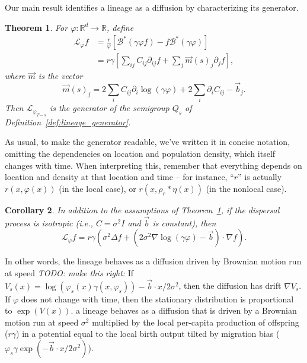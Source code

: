 \documentclass[12pt]{article}
\newtheorem{theorem}{Theorem}[section]
\newtheorem{corollary}[theorem]{Corollary}
\newcommand{\IR}{\mathbb R}
\newcommand{\grad}{\nabla}
\newcommand{\DG}{\mathcal{B}}  %
\newcommand{\meanq}{\vec b}    %
\newcommand{\covq}{C}     %
\newcommand{\kernel}{\rho}  %
\newcommand{\smooth}[1]{\kernel_{#1} \! * \!}  %
\newcommand{\Lgen}{\mathcal{L}}    %
\newcommand{\comment}[1]{{\color{blue} \it #1}}
\begin{document}
Our main result identifies a lineage as a diffusion
by characterizing its generator.


\begin{theorem} \label{thm:lineages}
    For $\varphi: \IR^d \to \IR$, define
    \begin{align}
        \label{eqn:lineage_generator}
        \Lgen_\varphi f
        &=
        \frac{r}{\varphi}
        \left[
            \DG^*(\gamma \varphi f) 
            - f \DG^* (\gamma \varphi)
        \right] \\
        &= \label{eqn:lineage_generator2}
        r\gamma
        \left[
            \sum_{ij} \covq_{ij} \partial_{ij} f
            + \sum_j \vec{m}(s)_j \partial_j f
        \right] ,
    \end{align}
    where $\vec{m}$ is the vector
    $$
    \vec{m}(s)_j
    =
    2 \sum_i C_{ij} \partial_i \log(\gamma \varphi)
    + 2 \sum_i \partial_i C_{ij}
    - \meanq_j .
    $$
    Then $\Lgen_{\varphi_{T-s}}$ is the generator of the semigroup $Q_s$
    of Definition~\ref{def:lineage_generator}.
\end{theorem}

As usual,
to make the generator readable, we've written it in concise notation,
omitting the dependencies on location and population density,
which itself changes with time.
When interpreting this,
remember that everything depends on location and density at that location and time --
for instance, ``$r$'' is actually $r(x, \varphi(x))$ (in the local case),
or $r(x, \smooth{r} \eta(x))$ (in the nonlocal case).

\begin{corollary} \label{cor:lineages_simple}
    In addition to the assumptions of Theorem~\ref{thm:lineages},
    if the dispersal process is isotropic
    (i.e., $\covq = \sigma^2 I$ and $\meanq$ is constant),
    then
    \begin{equation}
        \Lgen_\varphi f
        =
        r \gamma
        \left(
            \sigma^2 \Delta f
            +
            \left(
                2 \sigma^2 \grad \log(\gamma \varphi)
                - \meanq
            \right)
            \cdot \grad f
        \right) .
    \end{equation}
\end{corollary}

In other words, 
the lineage behaves as a diffusion driven by Brownian motion run at speed 
\comment{TODO: make this right:}
If $V_s(x) = \log(\varphi_s(x) \gamma(x, \varphi_s)) - \meanq \cdot x / 2 \sigma^2$,
then the diffusion has drift $\grad V_s$.
If $\varphi$ does not change with time, 
then the stationary distribution is proportional to $\exp(V(x))$.
a lineage behaves as a diffusion
that is driven by a Brownian motion 
run at speed $\sigma^2$ multiplied by the local per-capita production of offspring ($r \gamma$)
in a potential equal to the local birth output tilted by migration bias
($\varphi_s \gamma \exp(-\meanq \cdot x / 2 \sigma^2)$).
\end{document}
